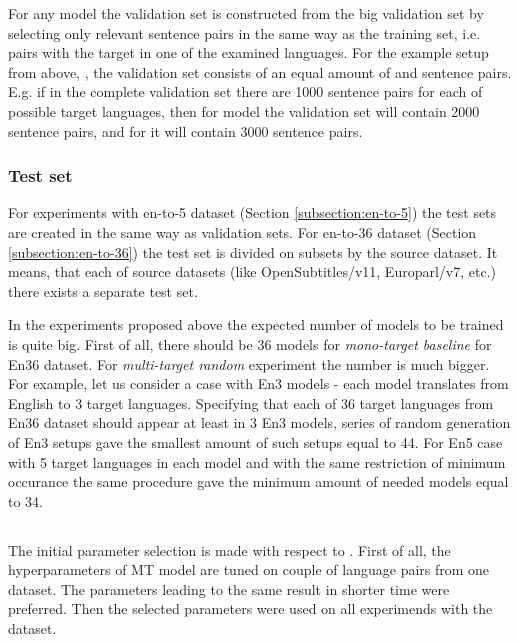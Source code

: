 For any model the validation set is constructed from the big validation set
by selecting only relevant sentence pairs in the same way as the training set,
i.e. pairs with the target in one of the examined languages.
For the example setup from above, , the validation set
consists of an equal amount of  and  sentence pairs.
E.g. if in the complete validation set there are 1000 sentence pairs for
each of possible target languages, then for 
model the validation set will contain 2000 sentence pairs, and for
 it will contain 3000 sentence pairs.

\subsubsection*{Test set}

For experiments with \gls{en-to-5} dataset (Section \ref{subsection:en-to-5})
the test sets are created in the same way as validation sets.
For \gls{en-to-36} dataset (Section \ref{subsection:en-to-36})
the test set is divided on subsets by the source dataset.
It means, that each of source datasets (like OpenSubtitles/v11, 
Europarl/v7, etc.) there exists a separate test set.

In the experiments proposed above the expected number of models to be trained is quite big.
First of all, there should be 36 models for \textit{mono-target baseline} for En\to{}36 dataset.
For \textit{multi-target random} experiment the number is much bigger.
For example, let us consider a case with En\to{}3 models - each model translates from English to 
3 target languages. Specifying that each of 36 target languages from En\to{}36 dataset
should appear at least in 3 En\to{}3 models, series of random generation of En\to{}3 setups gave
the smallest amount of such setups equal to 44. For En\to{}5 case with 5 target languages in each
model and with the same restriction of minimum occurance the same procedure gave the
minimum amount of needed models equal to 34.



\subsection{}

The initial parameter selection is made with respect to \cite{training-tips}.
First of all, the hyperparameters of MT model are tuned
on couple of language pairs from one dataset.
The parameters leading to the same result in shorter time were preferred.
Then the selected parameters were used on all experimends with the dataset.

